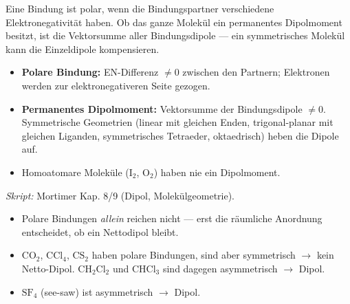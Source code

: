 
Eine Bindung ist polar, wenn die Bindungspartner verschiedene
Elektronegativität haben. Ob das ganze Molekül ein permanentes Dipolmoment
besitzt, ist die Vektorsumme aller Bindungsdipole --- ein symmetrisches
Molekül kann die Einzeldipole kompensieren.

\begin{werkzeugkasten}
\begin{itemize}
  \item \textbf{Polare Bindung:} EN-Differenz $\neq 0$ zwischen den Partnern;
        Elektronen werden zur elektronegativeren Seite gezogen.
  \item \textbf{Permanentes Dipolmoment:} Vektorsumme der Bindungsdipole
        $\neq 0$. Symmetrische Geometrien (linear mit gleichen Enden,
        trigonal-planar mit gleichen Liganden, symmetrisches Tetraeder,
        oktaedrisch) heben die Dipole auf.
  \item Homoatomare Moleküle ($\mathrm{I_2}$, $\mathrm{O_2}$) haben nie ein
        Dipolmoment.
\end{itemize}
\textit{Skript:} Mortimer Kap. 8/9 (Dipol, Molekülgeometrie).
\end{werkzeugkasten}

\begin{achtung}
\begin{itemize}
  \item Polare Bindungen \textit{allein} reichen nicht --- erst die
        räumliche Anordnung entscheidet, ob ein Nettodipol bleibt.
  \item $\mathrm{CO_2}$, $\mathrm{CCl_4}$, $\mathrm{CS_2}$ haben polare Bindungen,
        sind aber symmetrisch $\to$ kein Netto-Dipol. $\mathrm{CH_2Cl_2}$ und
        $\mathrm{CHCl_3}$ sind dagegen asymmetrisch $\to$ Dipol.
  \item $\mathrm{SF_4}$ (see-saw) ist asymmetrisch $\to$ Dipol.
\end{itemize}
\end{achtung}

